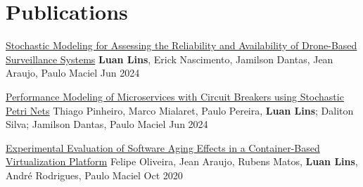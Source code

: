 \section{Publications}
    \resumeSubHeadingListStart

    \resumePubliSubheading
    {\href{https://doi.org/10.1109/SysCon61195.2024.10553470}{Stochastic Modeling for Assessing the Reliability and Availability of Drone-Based Surveillance Systems}}
    {\textbf{Luan Lins}, Erick Nascimento, Jamilson Dantas, Jean Araujo, Paulo Maciel}
    {Jun 2024}

    \resumePubliSubheading
    {\href{https://doi.org/10.1109/SysCon61195.2024.10553490}{Performance Modeling of Microservices with Circuit Breakers using Stochastic Petri Nets}}
    {Thiago Pinheiro, Marco Mialaret, Paulo Pereira, \textbf{Luan Lins}; Daliton Silva; Jamilson Dantas, Paulo Maciel}
    {Jun 2024}
    

    \resumePubliSubheading
    {\href{https://doi.org/10.1109/SMC42975.2020.9283358}{Experimental Evaluation of Software Aging Effects in a Container-Based Virtualization Platform}}
    {Felipe Oliveira, Jean Araujo, Rubens Matos, \textbf{Luan Lins}, André Rodrigues, Paulo Maciel}
    {Oct 2020}
    

    \resumeSubHeadingListEnd